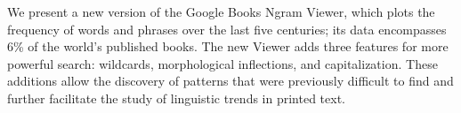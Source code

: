 We present a new version of the Google Books Ngram Viewer, which plots the frequency of words and phrases over the last five centuries; its data encompasses 6\% of the world's published books. The new Viewer adds three features for more powerful search: wildcards, morphological inflections, and capitalization. These additions allow the discovery of patterns that were previously difficult to find and further facilitate the study of linguistic trends in printed text.
